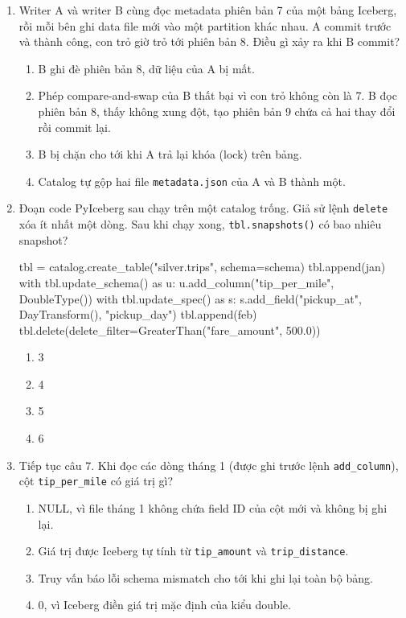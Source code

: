 \documentclass[12pt]{article}
\begin{document}
\begin{enumerate}[label=\textbf{\arabic*.}, leftmargin=1.6em, itemsep=1.2em]
\item Writer A và writer B cùng đọc metadata phiên bản 7 của một bảng Iceberg, rồi mỗi bên ghi data file mới vào một partition khác nhau. A commit trước và thành công, con trỏ giờ trỏ tới phiên bản 8. Điều gì xảy ra khi B commit?

\begin{enumerate}[label=\alph*), leftmargin=2.2em, itemsep=1pt]
    \item B ghi đè phiên bản 8, dữ liệu của A bị mất.
    \item Phép compare-and-swap của B thất bại vì con trỏ không còn là 7. B đọc phiên bản 8, thấy không xung đột, tạo phiên bản 9 chứa cả hai thay đổi rồi commit lại.
    \item B bị chặn cho tới khi A trả lại khóa (lock) trên bảng.
    \item Catalog tự gộp hai file \texttt{metadata.json} của A và B thành một.
\end{enumerate}

\item Đoạn code PyIceberg sau chạy trên một catalog trống. Giả sử lệnh \texttt{delete} xóa ít nhất một dòng. Sau khi chạy xong, \texttt{tbl.snapshots()} có bao nhiêu snapshot?

\begin{aivncodebox}[Code]
\begin{python}
tbl = catalog.create_table("silver.trips", schema=schema)
tbl.append(jan)
with tbl.update_schema() as u:
    u.add_column("tip_per_mile", DoubleType())
with tbl.update_spec() as s:
    s.add_field("pickup_at", DayTransform(), "pickup_day")
tbl.append(feb)
tbl.delete(delete_filter=GreaterThan("fare_amount", 500.0))
\end{python}
\end{aivncodebox}
\begin{enumerate}[label=\alph*), leftmargin=2.2em, itemsep=1pt]
    \item 3
    \item 4
    \item 5
    \item 6
\end{enumerate}

\item Tiếp tục câu 7. Khi đọc các dòng tháng 1 (được ghi trước lệnh \texttt{add\_column}), cột \texttt{tip\_per\_mile} có giá trị gì?

\begin{enumerate}[label=\alph*), leftmargin=2.2em, itemsep=1pt]
    \item NULL, vì file tháng 1 không chứa field ID của cột mới và không bị ghi lại.
    \item Giá trị được Iceberg tự tính từ \texttt{tip\_amount} và \texttt{trip\_distance}.
    \item Truy vấn báo lỗi schema mismatch cho tới khi ghi lại toàn bộ bảng.
    \item 0, vì Iceberg điền giá trị mặc định của kiểu double.
\end{enumerate}


\end{enumerate}
\end{document}

